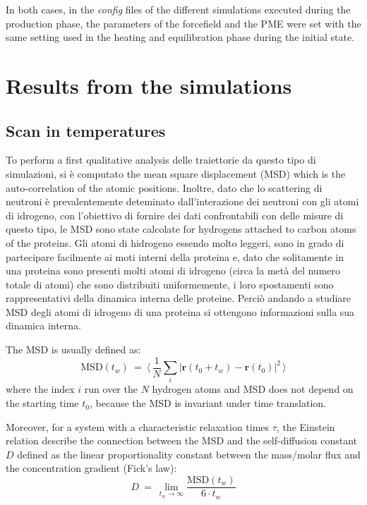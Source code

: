In both cases, in the \textit{config} files of the different simulations executed during the production phase, the parameters of the forcefield and the PME were set with the same setting used in the heating and equilibration phase during the initial state.

\section{Results from the simulations}
\subsection{Scan in temperatures}
To perform a first qualitative analysis delle traiettorie da questo tipo di simulazioni, si è computato the mean square displacement (MSD) which is the auto-correlation of the atomic positions. Inoltre, dato che lo scattering di neutroni è prevalentemente deteminato dall'interazione dei neutroni con gli atomi di idrogeno, con l'obiettivo di fornire dei dati confrontabili con delle misure di questo tipo, le MSD sono state calcolate for hydrogens attached to carbon atoms of the proteins. Gli atomi di hidrogeno essendo molto leggeri, sono in grado di partecipare facilmente ai moti interni della proteina e, dato che solitamente in una proteina sono presenti molti atomi di idrogeno (circa la metà del numero totale di atomi) che sono distribuiti uniformemente, i loro spostamenti sono rappresentativi della dinamica interna delle proteine. Perciò andando a studiare MSD degli atomi di idrogeno di una proteina si ottengono informazioni sulla sua dinamica interna.

The MSD is usually defined as:
\begin{equation}\label{eq:MSD}
\text{MSD}(t_w) \: = \: \langle \, \frac{1}{N} \sum_{i}  \left| \textbf{r}(t_0 + t_w) - \textbf{r}(t_0) \right|^2 \, \rangle
\end{equation}
where the index $i$ run over the $N$ hydrogen atoms and MSD does not depend on the starting time $t_0$, because the MSD is invariant under time translation.

Moreover, for a system with a characteristic relaxation times $\tau$, the Einstein relation describe the connection between the MSD and the self-diffusion constant $D$ defined as the linear proportionality constant between the mass/molar flux and the concentration gradient (Fick's law):
\begin{equation}
D \: = \: \lim_{t_w \rightarrow \infty} \frac{\text{MSD}(t_w)}{6 \cdot t_w} 
\end{equation}

